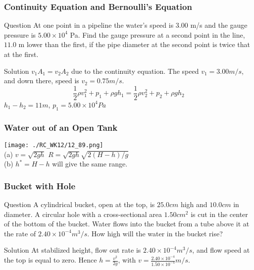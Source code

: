 \begin{frame}
\frametitle{Continuity Equation and Bernoulli's Equation}
\begin{block}{Question}
At one point in a pipeline the water's speed is $3.00$ m/s and the gauge pressure is $5.00\times 10^4$ Pa. Find the gauge pressure at a second point in the line, $11.0$ m lower than the first, if the pipe diameter at the second point is twice that at the first.
\end{block}
\begin{block}{Solution}
$v_1A_1=v_2A_2$ due to the continuity equation.
The speed $v_1=3.00\unit{m/s}$, and down there, speed is $v_2=0.75\unit{m/s}$.
\[\frac{1}{2}\rho v_1^2+p_1+\rho g h_1=\frac{1}{2}\rho v_2^2+p_2+\rho g h_2\]
$h_1-h_2=11\unit{m}$, $p_1=5.00\times 10^4\unit{Pa}$
\end{block}
\end{frame}
\begin{frame}
\frametitle{Water out of an Open Tank}
\begin{multicols}{2}
\texttt{[image: ./RC\_WK12/12\_89.png]}\\
(a) $v=\sqrt{2gh}$ $R=\sqrt{2gh}\sqrt{2(H-h)/g}$\\
(b) $h^*=H-h$ will give the same range.
\end{multicols}
\end{frame}
\begin{frame}
\frametitle{Bucket with Hole}
\begin{block}{Question}
A cylindrical bucket, open at the top, is $25.0\unit{cm}$ high and $10.0\unit{cm}$ in diameter. A circular hole with a cross-sectional area $1.50\unit{cm^2}$ is cut in the center of the bottom of the bucket. Water flows into the bucket from a tube above it at the rate of $2.40\times 10^{-4}\unit{m^3/s}$. How high will the water in the bucket rise?
\end{block}
\begin{block}{Solution}
At stabilized height, flow out rate is $2.40\times 10^{-4}\unit{m^3/s}$, and flow speed at the top is equal to zero. Hence $h=\frac{v^2}{2g}$, with $v=\frac{2.40\times 10^{-4}}{1.50\times 10^{-4}}\unit{m/s}$.
\end{block}
\end{frame}
